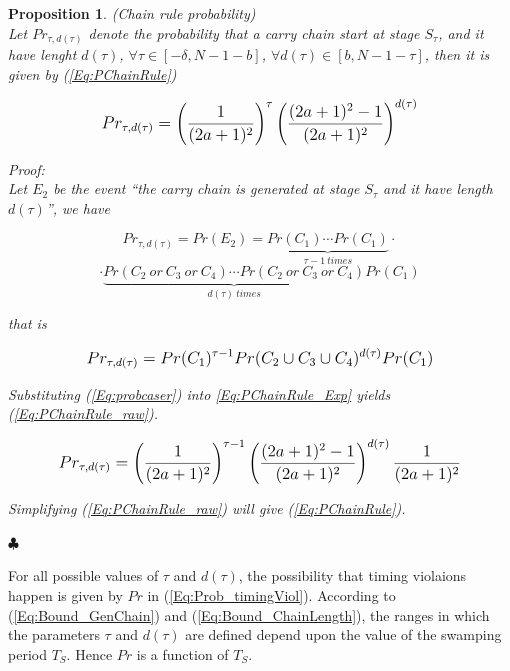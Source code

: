 \documentclass[journal]{IEEEtran}
\newtheorem{proposition}{Proposition}[section]
\begin{document}
\begin{proposition} (Chain rule probability)\\
Let $Pr_{\tau,d(\tau )}$ denote the probability that a carry chain start at stage $S_{\tau}$, and it have lenght $d(\tau )$, $\forall \tau \in [-\delta , N-1-b]$, $\forall d(\tau) \in [b , N-1-\tau]$, then it is given by (\ref{Eq:PChainRule})

\begin{equation}\label{Eq:PChainRule}
\footnotesize
Pr_{\tau,d(\tau )} =\left(\frac{1}{(2a+1)^2}\right)^\tau \left(\frac{(2a+1)^2-1}{(2a+1)^2}\right)^{d(\tau )}
\normalsize
\end{equation}

\noindent Proof:\\

Let $E_2$ be the event ``the carry chain is generated at stage $S_{\tau}$ and it have length $d(\tau )$'', we have

\begin{equation}
Pr_{\tau,d(\tau )} = Pr(E_2)=  \underbrace{Pr(C_1)\cdots  Pr(C_1)}_{\tau -1 \ times}\cdot
\end{equation}
$$
\cdot  \underbrace{ Pr(C_2 \ or \ C_3   \ or \ C_4)\cdots Pr(C_2  \ or \   C_3   \ or \   C_4)}_{d(\tau) \  times}   Pr(C_1)$$

that is

\begin{equation}\label{Eq:PChainRule_Exp}
\scriptsize
Pr_{\tau,d(\tau )} = Pr(C_1)^{\tau -1} Pr(C_2 \cup C_3 \cup C_4)^{d(\tau )} Pr(C_1)
\normalsize
\end{equation}

Substituting (\ref{Eq:probcaser}) into \ref{Eq:PChainRule_Exp} yields (\ref{Eq:PChainRule_raw}).

\begin{equation}\label{Eq:PChainRule_raw}
\scriptsize
Pr_{\tau,d(\tau )}= \left(\frac{1}{(2a+1)^2}\right)^{\tau -1} \left(\frac{(2a+1)^2-1}{(2a+1)^2}\right)^{d(\tau )} \frac{1}{(2a+1)^2}
\normalsize
\end{equation}

Simplifying (\ref{Eq:PChainRule_raw}) will give (\ref{Eq:PChainRule}).

\hspace{7cm} $\clubsuit$
\vspace{1ex}

\end{proposition}

For all possible values of $\tau$ and $d(\tau)$, the possibility that timing violaions happen is given by $Pr$ in (\ref{Eq:Prob_timingViol}). According to (\ref{Eq:Bound_GenChain}) and (\ref{Eq:Bound_ChainLength}), the ranges in which the parameters $\tau$ and $d(\tau)$ are defined depend upon the value of the swamping period $T_S$. Hence $Pr$ is a function of $T_S$.
\end{document}
